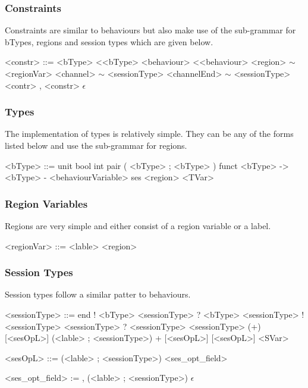\subsubsection{Constraints}

Constraints are similar to behaviours but also make use of the sub-grammar for bTypes, regions and session types which are given below. 

\begin{grammar}

<constr> ::= <bType> \textless <bType>
\alt <behaviour> \textless <behaviour>
\alt <region> $\sim$ <regionVar>
\alt <channel> $\sim$ <sessionType>
\alt <channelEnd> $\sim$ <sessionType>
\alt <contr> , <constr>
\alt $\epsilon$

\end{grammar}

\subsubsection{Types}

The implementation of types is relatively simple. They can be any of the forms listed below and use the sub-grammar for regions. 
\begin{grammar}

<bType> ::= unit
\alt bool 
\alt int
\alt pair ( <bType> ; <bType> )
\alt funct <bType> -\textgreater <bType> - <behaviourVariable>
\alt ses <region>
\alt <TVar>

\end{grammar}

\subsubsection {Region Variables}

Regions are very simple and either consist of a region variable or a label. 

\begin{grammar}

<regionVar> ::= <lable>
\alt <region>

\end{grammar}

\subsubsection{Session Types}

Session types follow a similar patter to behaviours.

\begin{grammar}

<sessionType> ::= end
\alt ! <bType> <sessionType>
\alt ? <bType> <sessionType>
\alt ! <sessionType> <sessionType>
\alt ? <sessionType> <sessionType>
\alt (+) [<sesOpL>] (<lable> ; <sessionType>)
\alt + [<sesOpL>] [<sesOpL>]
\alt <SVar>

<sesOpL> ::= (<lable> ; <sessionType>) <ses_opt_field>

<ses_opt_field> := , (<lable> ; <sessionType>)
\alt $\epsilon$

\end{grammar}

